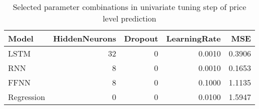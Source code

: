 \begin{table}[h!]
\centering
 \begin{adjustbox}{max width=\textwidth}
\begin{tabular}{lrrrr}
  \hline
Model & HiddenNeurons & Dropout & LearningRate & MSE \\ 
  \hline
LSTM &    32 &     0 & 0.0010 & 0.3906 \\ 
  RNN &     8 &     0 & 0.0010 & 0.1653 \\ 
  FFNN &     8 &     0 & 0.1000 & 1.1135 \\ 
  Regression &     0 &     0 & 0.0100 & 1.5947 \\ 
   \hline
 \end{tabular}
\end{adjustbox}
\caption{Selected parameter combinations in univariate tuning step of price level prediction} 
\label{tab:level.par.tuning.short}
\end{table}

